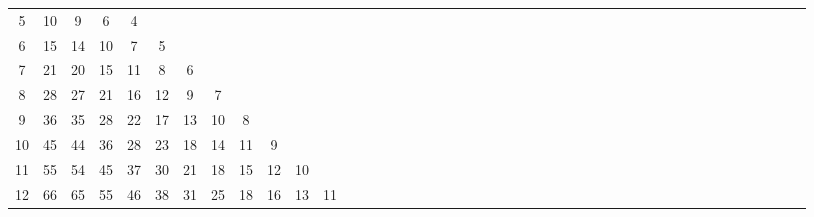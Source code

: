 \documentclass[12pt,a4paper]{amsart}
\theoremstyle{definition} %
\theoremstyle{plain} %
\begin{document}
\begin{table}[h]
{\begin{tabular}{|c|*{44}{c|}}
            5 &  10 &   9 &   6 &   4 &     &     &     &     &     &      &      &      &      &      &      &      &      &      &      &      &      &      &      &      &      &      &      &      &      &      &      &      &      &      &      &      &      &      &      &      &      &      &      &      \\
            6 &  15 &  14 &  10 &   7 &   5 &     &     &     &     &      &      &      &      &      &      &      &      &      &      &      &      &      &      &      &      &      &      &      &      &      &      &      &      &      &      &      &      &      &      &      &      &      &      &      \\
            7 &  21 &  20 &  15 &  11 &   8 &   6 &     &     &     &      &      &      &      &      &      &      &      &      &      &      &      &      &      &      &      &      &      &      &      &      &      &      &      &      &      &      &      &      &      &      &      &      &      &      \\
            8 &  28 &  27 &  21 &  16 &  12 &   9 &   7 &     &     &      &      &      &      &      &      &      &      &      &      &      &      &      &      &      &      &      &      &      &      &      &      &      &      &      &      &      &      &      &      &      &      &      &      &      \\
            9 &  36 &  35 &  28 &  22 &  17 &  13 &  10 &   8 &     &      &      &      &      &      &      &      &      &      &      &      &      &      &      &      &      &      &      &      &      &      &      &      &      &      &      &      &      &      &      &      &      &      &      &      \\
            10 &  45 &  44 &  36 &  28 &  23 &  18 &  14 &  11 &   9 &      &      &      &      &      &      &      &      &      &      &      &      &      &      &      &      &      &      &      &      &      &      &      &      &      &      &      &      &      &      &      &      &      &      &      \\
            11 &  55 &  54 &  45 &  37 &  30 &  21 &  18 &  15 &  12 &   10 &      &      &      &      &      &      &      &      &      &      &      &      &      &      &      &      &      &      &      &      &      &      &      &      &      &      &      &      &      &      &      &      &      &      \\
            12 &  66 &  65 &  55 &  46 &  38 &  31 &  25 &  18 &  16 &   13 &   11 &      &      &      &      &      &      &      &      &      &      &      &      &      &      &      &      &      &      &      &      &      &      &      &      &      &      &      &      &      &      &      &      &      \\

\end{tabular}}
\end{table}
\end{document}
